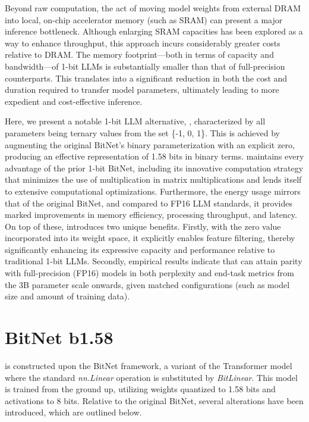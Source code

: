 Beyond raw computation, the act of moving model weights from external DRAM into local, on-chip accelerator memory (such as SRAM) can present a major inference bottleneck. Although enlarging SRAM capacities has been explored as a way to enhance throughput, this approach incurs considerably greater costs relative to DRAM. The memory footprint—both in terms of capacity and bandwidth—of 1-bit LLMs is substantially smaller than that of full-precision counterparts. This translates into a significant reduction in both the cost and duration required to transfer model parameters, ultimately leading to more expedient and cost-effective inference.

Here, we present a notable 1-bit LLM alternative, \textbf{}, characterized by all parameters being ternary values from the set \{-1, 0, 1\}. This is achieved by augmenting the original BitNet’s binary parameterization with an explicit zero, producing an effective representation of 1.58 bits in binary terms.  maintains every advantage of the prior 1-bit BitNet, including its innovative computation strategy that minimizes the use of multiplication in matrix multiplications and lends itself to extensive computational optimizations. Furthermore, the energy usage mirrors that of the original BitNet, and compared to FP16 LLM standards, it provides marked improvements in memory efficiency, processing throughput, and latency. On top of these,  introduces two unique benefits. Firstly, with the zero value incorporated into its weight space, it explicitly enables feature filtering, thereby significantly enhancing its expressive capacity and performance relative to traditional 1-bit LLMs. Secondly, empirical results indicate that  can attain parity with full-precision (FP16) models in both perplexity and end-task metrics from the 3B parameter scale onwards, given matched configurations (such as model size and amount of training data).

\section{BitNet b1.58}

 is constructed upon the BitNet framework, a variant of the Transformer model where the standard \emph{nn.Linear} operation is substituted by \emph{BitLinear}. This model is trained from the ground up, utilizing weights quantized to 1.58 bits and activations to 8 bits. Relative to the original BitNet, several alterations have been introduced, which are outlined below.

